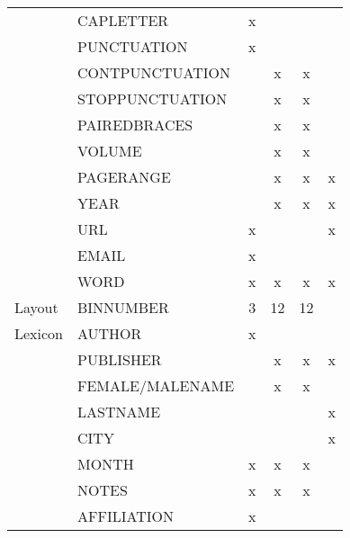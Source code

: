 {\begin{minipage}[c]{\linewidth}
\begin{tabular}{l l c c c c}
          & CAPLETTER            & x       &             &          &       \\
          & PUNCTUATION          & x       &             &          &       \\
          & CONTPUNCTUATION      &         & x           & x        &       \\
          & STOPPUNCTUATION      &         & x           & x        &       \\
          & PAIREDBRACES         &         & x           & x        &       \\
          & VOLUME               &         & x           & x        &       \\
          & PAGERANGE            &         & x           & x        &  x    \\
          & YEAR                 &         & x           & x        &  x    \\
          & URL                  & x       &             &          &  x    \\
          & EMAIL                & x       &             &          &       \\
          & WORD                 & x       & x           & x        &  x    \\
  \midrule
  Layout  & BINNUMBER            & 3       & 12          & 12       &       \\
  \midrule
  Lexicon & AUTHOR               & x       &             &          &       \\
          & PUBLISHER            &         & x           & x        & x     \\
          & FEMALE/MALENAME      &         & x           & x        &       \\
          & LASTNAME             &         &             &          & x     \\
          & CITY                 &         &             &          & x     \\
          & MONTH                & x       & x           & x        &       \\
          & NOTES                & x       & x           & x        &       \\
          & AFFILIATION          & x       &             &          &       \\
  \bottomrule
\end{tabular}
\label{tab:feature-survey}
\end{minipage}
}

